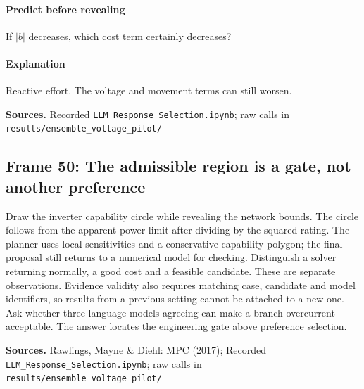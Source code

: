 \documentclass[11pt]{article}
\begin{document}
\paragraph{Predict before revealing}If $|b|$ decreases, which cost term certainly decreases?
\paragraph{Explanation}Reactive effort. The voltage and movement terms can still worsen.
\par\nopagebreak\begin{minipage}{\linewidth}{\footnotesize\color{slate}\textbf{Sources.} Recorded \texttt{LLM\_Response\_Selection.ipynb}; raw calls in \texttt{results/ensemble\_voltage\_pilot/}\par}\end{minipage}\par\medskip
\subsection*{Frame 50: The admissible region is a gate, not another preference}
Draw the inverter capability circle while revealing the network bounds. The circle follows from the apparent-power limit after dividing by the squared rating. The planner uses local sensitivities and a conservative capability polygon; the final proposal still returns to a numerical model for checking. Distinguish a solver returning normally, a good cost and a feasible candidate. These are separate observations. Evidence validity also requires matching case, candidate and model identifiers, so results from a previous setting cannot be attached to a new one. Ask whether three language models agreeing can make a branch overcurrent acceptable. The answer locates the engineering gate above preference selection.\par
\par\nopagebreak\begin{minipage}{\linewidth}{\footnotesize\color{slate}\textbf{Sources.} \href{https://sites.engineering.ucsb.edu/~jbraw/mpc/}{Rawlings, Mayne \& Diehl: MPC (2017)}; Recorded \texttt{LLM\_Response\_Selection.ipynb}; raw calls in \texttt{results/ensemble\_voltage\_pilot/}\par}\end{minipage}\par\medskip
\end{document}
